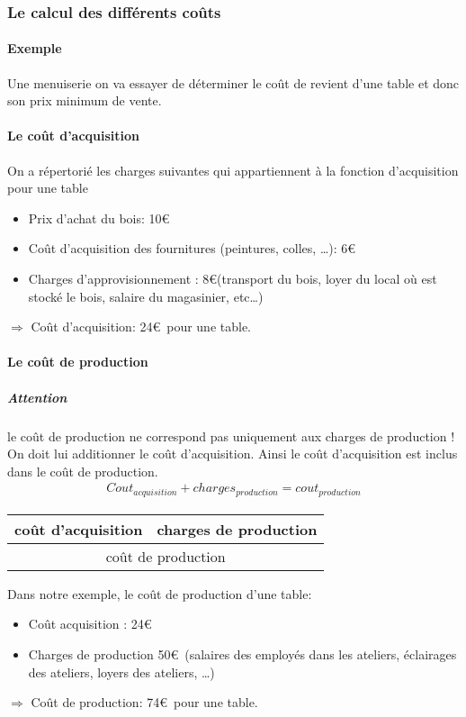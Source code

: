\documentclass[12pt,a4paper,openany]{report}
\begin{document}
	\subsubsection{Le calcul des différents coûts}
	\paragraph{Exemple} Une menuiserie on va essayer de déterminer le coût de revient d'une table et donc
	son prix minimum de vente.
	\paragraph{Le coût d'acquisition}
	On a répertorié les charges suivantes qui appartiennent à la fonction d'acquisition pour une table
	\begin{itemize}
		\item Prix d'achat du bois: 10\euro
		\item Coût d'acquisition des fournitures (peintures, colles, \ldots): 6\euro
		\item Charges d'approvisionnement : 8\euro (transport du bois, loyer du local où est stocké
			le bois, salaire du magasinier, etc\ldots)
	\end{itemize}
	\begin{center}$\Rightarrow$ Coût d'acquisition: 24\euro~pour une table.\end{center}
		\paragraph{Le coût de production}
		\subparagraph{Attention} le coût de production ne correspond pas uniquement aux charges de production !\\
		On doit lui additionner le coût d'acquisition. Ainsi le coût d'acquisition est inclus dans le coût de production.
		\begin{eqnarray*} Cout_{acquisition} + charges_{production} = cout_{production} \end{eqnarray*}
			\begin{center}
			\begin{tabular}{|c|c|}
				\hline
				coût d'acquisition & charges de production \\
				\hline
				\multicolumn{2}{|c|}{coût de production}\\
				\hline
			\end{tabular}
		\end{center}
		Dans notre exemple, le coût de production d'une table: 
		\begin{itemize}
			\item Coût acquisition : 24\euro
			\item Charges de production 50\euro~(salaires des employés dans les ateliers, éclairages des ateliers, loyers des ateliers, \ldots)
		\end{itemize}
	\begin{center}$\Rightarrow$ Coût de production: 74\euro~pour une table.\end{center}
\end{document}
